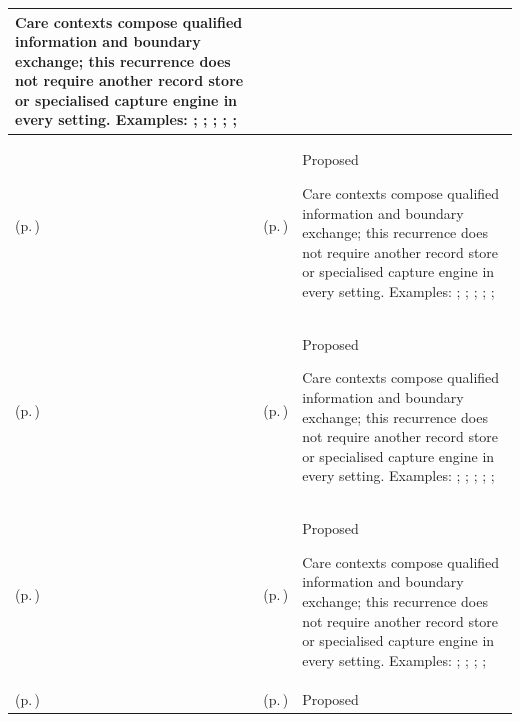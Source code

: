 \begin{longtable}{|>{\raggedright\arraybackslash}p{0.27\TableWidth}|>{\raggedright\arraybackslash}p{0.27\TableWidth}|>{\raggedright\arraybackslash}p{0.46\TableWidth}|}
Care contexts compose qualified information and boundary exchange; this recurrence does not require another record store or specialised capture engine in every setting. Examples: \nameref{feature:feat-sd-15}; \nameref{feature:feat-sd-16}; \nameref{function:synchronize-community-visit-record}; \nameref{service:community-care-encounter-ingress}; \nameref{function:bind-community-support-network-context}; \nameref{service:community-care-team-query}\\\hline
\nameref{cap:bec-community-care} (p.\,\pageref{cap:bec-community-care}) & \nameref{cap:ec-04} (p.\,\pageref{cap:ec-04}) & Proposed

Care contexts compose qualified information and boundary exchange; this recurrence does not require another record store or specialised capture engine in every setting. Examples: \nameref{feature:feat-sd-15}; \nameref{feature:feat-sd-16}; \nameref{function:synchronize-community-visit-record}; \nameref{service:community-care-encounter-ingress}; \nameref{function:bind-community-support-network-context}; \nameref{service:community-care-team-query}\\\hline
\nameref{cap:bec-community-care} (p.\,\pageref{cap:bec-community-care}) & \nameref{cap:ec-08} (p.\,\pageref{cap:ec-08}) & Proposed

Care contexts compose qualified information and boundary exchange; this recurrence does not require another record store or specialised capture engine in every setting. Examples: \nameref{feature:feat-sd-15}; \nameref{feature:feat-sd-16}; \nameref{function:synchronize-community-visit-record}; \nameref{service:community-care-encounter-ingress}; \nameref{function:bind-community-support-network-context}; \nameref{service:community-care-team-query}\\\hline
\nameref{cap:bec-outreach-care} (p.\,\pageref{cap:bec-outreach-care}) & \nameref{cap:ec-02} (p.\,\pageref{cap:ec-02}) & Proposed

Care contexts compose qualified information and boundary exchange; this recurrence does not require another record store or specialised capture engine in every setting. Examples: \nameref{feature:feat-sd-17}; \nameref{feature:feat-sd-18}; \nameref{function:provide-outreach-visit-context}; \nameref{function:reconcile-outreach-clinical-batch}; \nameref{service:outreach-batch-reconciliation-service}\\\hline
\nameref{cap:bec-outreach-care} (p.\,\pageref{cap:bec-outreach-care}) & \nameref{cap:ec-04} (p.\,\pageref{cap:ec-04}) & Proposed


\end{longtable}
